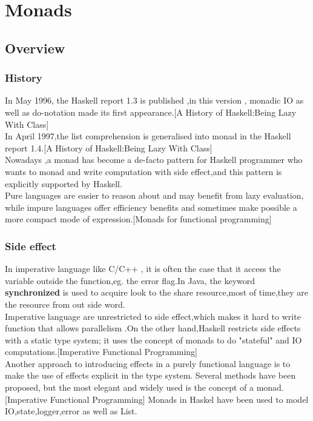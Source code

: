 \chapter{Monads}
\section{Overview}


\subsection{History}
In May 1996, the Haskell report 1.3 is published ,in this version , monadic IO as well as do-notation made its first appearance.[A History of Haskell:Being Lazy With Class] \\

In April 1997,the list comprehension is generalised into monad in the Haskell report 1.4.[A History of Haskell:Being Lazy With Class]\\ 

Nowadays ,a monad has become a de-facto pattern for Haskell programmer who wants to monad and write computation with side effect,and this pattern is explicitly supported by Haskell.\\


Pure languages are easier to reason about and may benefit from lazy
evaluation, while impure languages offer efficiency benefits and sometimes make possible a more compact mode of expression.[Monads for functional programming]



\subsection{Side effect}
In imperative language like C/C++ , it is often the case that it access the variable outside the function,eg. the error flag.In Java, the keyword \textbf{synchronized} is used to acquire look to the share resource,most of time,they are the resource from out side word.\\

Imperative language are unrestricted to side effect,which makes it hard to write function that allows parallelism .On the other hand,Haskell restricts side effects with a static type system; it uses the concept of monads to do "stateful" and IO computations.[Imperative Functional Programming]\\

Another approach to introducing effects in a purely functional language
is to make the use of effects explicit in the type system. Several methods
have been proposed, but the most elegant and widely used is the concept
of a monad.[Imperative Functional Programming]  Monads in Haskel have been used to model IO,state,logger,error as well as List.


